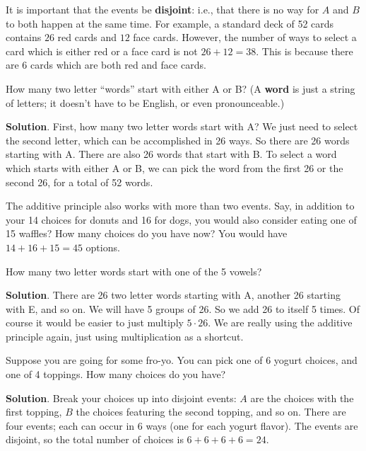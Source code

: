 \documentclass[11pt,]{book}
\newcommand{\terminology}[1]{\textbf{#1}}
\theoremstyle{ptxplainnotitle}
\theoremstyle{ptxplaintitle}
\theoremstyle{ptxdefinitionnotitle}
\theoremstyle{ptxdefinitiontitle}
\theoremstyle{ptxdefinitionnotitle}
\theoremstyle{ptxdefinitiontitle}
\theoremstyle{ptxdefinitionnotitle}
\theoremstyle{ptxdefinitiontitle}
\theoremstyle{ptxdefinitiontitlenonumber}
\theoremstyle{ptxdefinitiontitlenonumber}
\numberwithin{equation}{chapter}
\begin{document}
\hypertarget{p-1034}{}%
It is important that the events be \terminology{disjoint}: i.e., that there is no way for \(A\) and \(B\) to both happen at the same time. For example, a standard deck of 52 cards contains \(26\) red cards and \(12\) face cards. However, the number of ways to select a card which is either red or a face card is not \(26 + 12 = 38\). This is because there are 6 cards which are both red and face cards.%
\begin{example}\label{example-34}
\hypertarget{p-1035}{}%
How many two letter ``words'' start with either A or B? (A \terminology{word} is just a string of letters; it doesn't have to be English, or even pronounceable.)%
\par\smallskip%
\noindent\textbf{Solution}.\hypertarget{solution-143}{}\quad%
\hypertarget{p-1036}{}%
First, how many two letter words start with A? We just need to select the second letter, which can be accomplished in 26 ways. So there are 26 words starting with A. There are also 26 words that start with B. To select a word which starts with either A or B, we can pick the word from the first 26 or the second 26, for a total of 52 words.%
\end{example}
\hypertarget{p-1037}{}%
The additive principle also works with more than two events. Say, in addition to your 14 choices for donuts and 16 for dogs, you would also consider eating one of 15 waffles? How many choices do you have now? You would have \(14 + 16 + 15 = 45\) options.%
\begin{example}\label{example-35}
\hypertarget{p-1038}{}%
How many two letter words start with one of the 5 vowels?%
\par\smallskip%
\noindent\textbf{Solution}.\hypertarget{solution-144}{}\quad%
\hypertarget{p-1039}{}%
There are 26 two letter words starting with A, another 26 starting with E, and so on. We will have 5 groups of 26. So we add 26 to itself 5 times. Of course it would be easier to just multiply \(5\cdot 26\). We are really using the additive principle again, just using multiplication as a shortcut.%
\end{example}
\begin{example}\label{example-36}
\hypertarget{p-1040}{}%
Suppose you are going for some fro-yo. You can pick one of 6 yogurt choices, and one of 4 toppings. How many choices do you have?%
\par\smallskip%
\noindent\textbf{Solution}.\hypertarget{solution-145}{}\quad%
\hypertarget{p-1041}{}%
Break your choices up into disjoint events: \(A\) are the choices with the first topping, \(B\) the choices featuring the second topping, and so on. There are four events; each can occur in 6 ways (one for each yogurt flavor). The events are disjoint, so the total number of choices is \(6 + 6 + 6 + 6 = 24\).%
\end{example}
\end{document}
